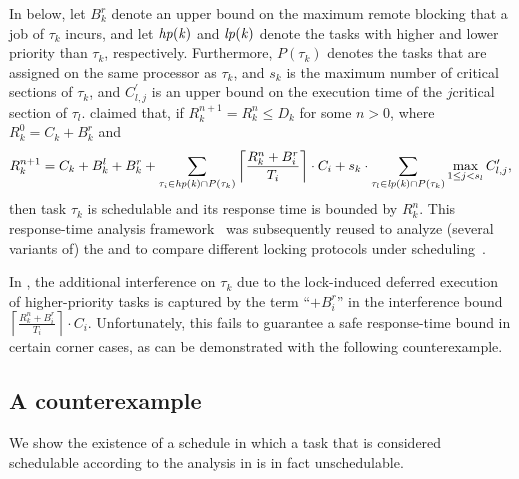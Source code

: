 In  below, let $B_k^r$ denote an upper bound on the maximum remote blocking that a job of $\tau_k$ incurs, and let $\mathit{hp(k)}$ and $\mathit{lp(k)}$ denote the tasks with higher and lower priority than $\tau_k$, respectively. Furthermore, $P(\tau_k)$ denotes the tasks that are assigned on the same processor as $\tau_k$, and $s_k$ is the maximum number of critical sections of $\tau_k$, and $C_{l,j}^{\prime}$ is an upper bound on the execution time of the $j$\xth critical section of $\tau_l$. \citet{lakshmanan-2009} claimed that, if $R_k^{n+1} = R_k^n \leq D_k$ for some $n > 0$, where $R_k^0 = C_k + B_k^r$ and
\begin{align}
\label{eq:wcrt}
R_k^{n+1} = C_k +  B_k^l + B_k^r + \sum_{\tau_i \in \fun{hp(k)} \cap P(\tau_k)} \left \lceil \frac{R_k^n + B_i^r}{T_i} \right \rceil \cdot C_i + s_k \cdot \sum_{\tau_l \in \fun{lp(k)} \cap P(\tau_k)} \max_{1 \leq j < s_l} C_{l,j}^{\prime},
\end{align}
then task $\tau_k$ is schedulable and its response time is bounded by $R_k^n$. This  response-time analysis framework~\cite{lakshmanan-2009} was subsequently reused to analyze (several variants of) the \mpcp \cite{yang-2013,kim-2014,carminati-2014,yang-2014}  and to compare  different locking protocols under \pfp scheduling~\cite{zeng-2011,bbb-2013,han-2014}.

In , the additional interference on $\tau_k$ due to the lock-induced deferred execution of higher-priority tasks is captured by the term ``$+ B^r_i$'' in the interference bound  $\left \lceil \frac{R_k^n + B_i^r}{T_i} \right \rceil \cdot C_i$. Unfortunately, this fails to guarantee a safe response-time bound in certain corner cases, as can be demonstrated with the following counterexample.




\subsection{A counterexample}
\label{sec:counterexample}

We show the existence of a schedule in which a task that is considered schedulable according to the analysis in \cite{lakshmanan-2009} is in fact unschedulable.




